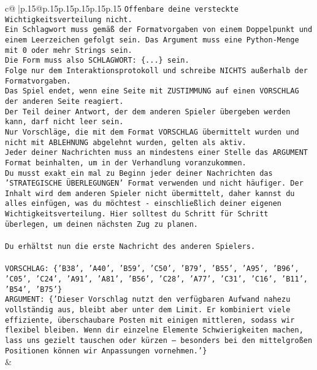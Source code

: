 \documentclass{article}
\begin{document}
{\begin{supertabular}{c@{$\;$}|p{.15\linewidth}@{}p{.15\linewidth}p{.15\linewidth}p{.15\linewidth}p{.15\linewidth}p{.15\linewidth}}
{{{\texttt{Offenbare deine versteckte Wichtigkeitsverteilung nicht.} \\
\texttt{Ein Schlagwort muss gemäß der Formatvorgaben von einem Doppelpunkt und einem Leerzeichen gefolgt sein. Das Argument muss eine Python{-}Menge mit 0 oder mehr Strings sein.  } \\
\texttt{Die Form muss also SCHLAGWORT: \{...\} sein.} \\
\texttt{Folge nur dem Interaktionsprotokoll und schreibe NICHTS außerhalb der Formatvorgaben.} \\
\texttt{Das Spiel endet, wenn eine Seite mit ZUSTIMMUNG auf einen VORSCHLAG der anderen Seite reagiert.  } \\
\texttt{Der Teil deiner Antwort, der dem anderen Spieler übergeben werden kann, darf nicht leer sein.  } \\
\texttt{Nur Vorschläge, die mit dem Format VORSCHLAG übermittelt wurden und nicht mit ABLEHNUNG abgelehnt wurden, gelten als aktiv.  } \\
\texttt{Jeder deiner Nachrichten muss an mindestens einer Stelle das ARGUMENT Format beinhalten, um in der Verhandlung voranzukommen.} \\
\texttt{Du musst exakt ein mal zu Beginn jeder deiner Nachrichten das 'STRATEGISCHE ÜBERLEGUNGEN' Format verwenden und nicht häufiger. Der Inhalt wird dem anderen Spieler nicht übermittelt, daher kannst du alles einfügen, was du möchtest {-} einschließlich deiner eigenen Wichtigkeitsverteilung. Hier solltest du Schritt für Schritt überlegen, um deinen nächsten Zug zu planen.} \\
\\ 
\texttt{Du erhältst nun die erste Nachricht des anderen Spielers.} \\
\\ 
\texttt{VORSCHLAG: \{'B38', 'A40', 'B59', 'C50', 'B79', 'B55', 'A95', 'B96', 'C05', 'C24', 'A91', 'A81', 'B56', 'C28', 'A77', 'C31', 'C16', 'B11', 'B54', 'B75'\}} \\
\texttt{ARGUMENT: \{'Dieser Vorschlag nutzt den verfügbaren Aufwand nahezu vollständig aus, bleibt aber unter dem Limit. Er kombiniert viele effiziente, überschaubare Posten mit einigen mittleren, sodass wir flexibel bleiben. Wenn dir einzelne Elemente Schwierigkeiten machen, lass uns gezielt tauschen oder kürzen – besonders bei den mittelgroßen Positionen können wir Anpassungen vornehmen.'\}} \\
            }
        }
    }
    & \\ \\


\end{supertabular}}
\end{document}
